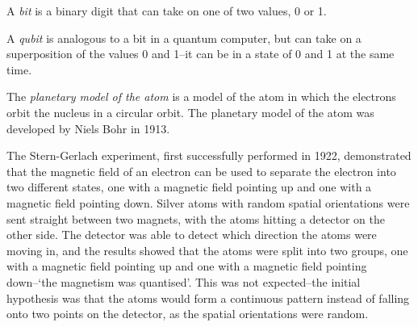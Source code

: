 
\begin{definition}
    A \emph{bit} is a binary digit that can take on one of two values, 0 or 1.
\end{definition}
\begin{definition}
    A \emph{qubit} is analogous to a bit in a quantum computer, but can take on a superposition of the values 0 and 1--it can be in a state of 0 and 1 at the same time.
\end{definition}
\begin{definition}
    The \emph{planetary model of the atom} is a model of the atom in which the electrons orbit the nucleus in a circular orbit. The planetary model of the atom was developed by Niels Bohr in 1913.
\end{definition}
The Stern-Gerlach experiment, first successfully performed in 1922, demonstrated that the magnetic field of an electron can be used to separate the electron into two different states, one with a magnetic field pointing up and one with a magnetic field pointing down. Silver atoms with random spatial orientations were sent straight between two magnets, with the atoms hitting a detector on the other side. The detector was able to detect which direction the atoms were moving in, and the results showed that the atoms were split into two groups, one with a magnetic field pointing up and one with a magnetic field pointing down--`the magnetism was quantised'. This was not expected--the initial hypothesis was that the atoms would form a continuous pattern instead of falling onto two points on the detector, as the spatial orientations were random.
